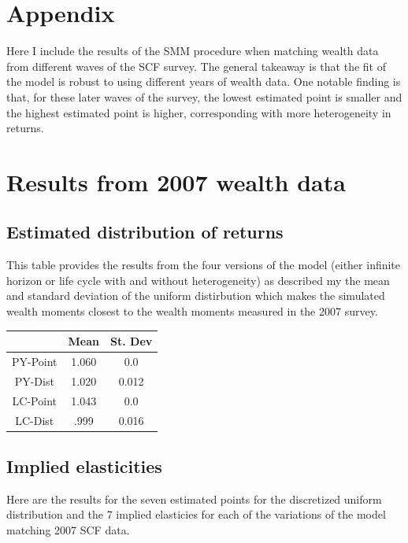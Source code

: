 \section*{Appendix}

\par Here I include the results of the SMM procedure when matching wealth data from different waves of the SCF survey. The general takeaway is that the fit of the model is robust to using different years of wealth data. One notable finding is that, for these later waves of the survey, the lowest estimated point is smaller and the highest estimated point is higher, corresponding with more heterogeneity in returns. 

\section{Results from 2007 wealth data}

\subsection{Estimated distribution of returns}

\par This table provides the results from the four versions of the model (either infinite horizon or life cycle with and without heterogeneity) as described my the mean and standard deviation of the uniform distirbution which makes the simulated wealth moments closest to the wealth moments measured in the 2007 survey.

\begin{center}
    \begin{tabular}{|c|c|c|}
\hline
& Mean & St. Dev \\
\hline
PY-Point & 1.060 & 0.0  \\
PY-Dist & 1.020  &  0.012  \\
LC-Point & 1.043 & 0.0  \\
LC-Dist & .999  &  0.016 \\
\hline
    \end{tabular}
    \end{center}

\subsection{Implied elasticities}

\par Here are the results for the seven estimated points for the discretized uniform distribution and the 7 implied elasticies for each of the variations of the model matching 2007 SCF data. 

